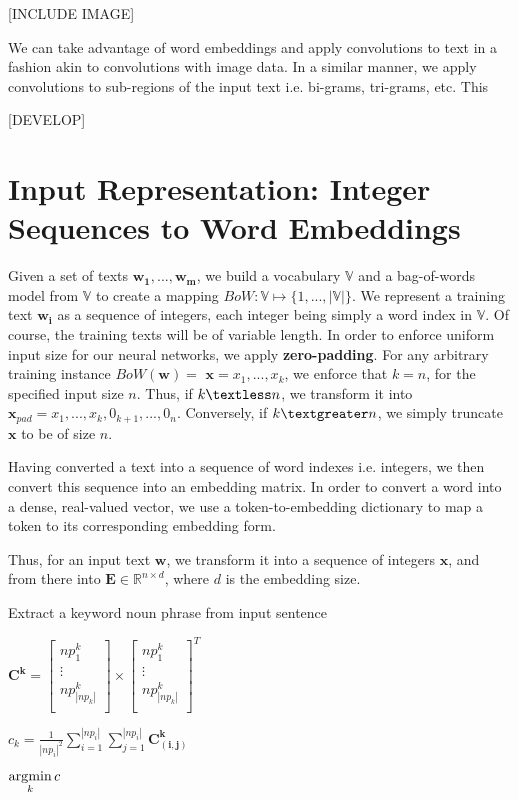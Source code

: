 [INCLUDE IMAGE]

We can take advantage of word embeddings and apply convolutions to text in a fashion akin to convolutions with
image data. In a similar manner, we apply convolutions to sub-regions of the input text i.e. bi-grams, tri-grams, etc.
This


[DEVELOP]

\section{Input Representation: Integer Sequences to Word Embeddings}
Given a set of texts $\bm{w_1},...,\bm{w_m}$, we build a vocabulary $\mathbb{V}$ and a bag-of-words model from $\mathbb{V}$ to create a mapping $BoW:\mathbb{V} \mapsto \{1,...,|\mathbb{V}|\}$.
We represent a training text $\bm{w_i}$ as a sequence of integers, each integer being simply a word index
in $\mathbb{V}$. Of course, the training texts will be of variable length. In order to enforce uniform input size for our neural networks, we apply \textbf{zero-padding}.
For any arbitrary training instance $BoW(\bm{w})=$ $\bm{x} = x_1,...,x_k$, we enforce that $k = n$, for the specified input size
$n$. Thus, if $k \textless n$, we transform it into $\bm{x}_{pad} = x_1,...,x_k, 0_{k+1}, ..., 0_{n}$. Conversely, if
$k \textgreater n$, we simply truncate $\bm{x}$ to be of size $n$.

Having converted a text into a sequence of word indexes i.e. integers, we then convert this sequence into an embedding matrix.
In order to convert a word into a dense, real-valued vector, we use a token-to-embedding dictionary to map a token to its corresponding embedding form.

Thus, for an input text $\bm{w}$, we transform it into a sequence of integers $\bm{x}$, and from there into $\mathbf{E} \in \mathbb{R}^{n \times d}$, where $d$ is
the embedding size.

\begin{algorithm}[H]
\caption{Extract a keyword noun phrase from input sentence}
\begin{algorithmic}[1]
\State$ \bm{C^k} = \begin{bmatrix}
         np^{k}_{1} \\
         \vdots \\
         np^{k}_{|np_k|} \\
        \end{bmatrix} \times  \begin{bmatrix}
         np^{k}_{1} \\
         \vdots \\
         np^{k}_{|np_k|} \\
        \end{bmatrix}^{T}$

\State$c_{k} = \frac{1}{|np_i|^2} \sum^{|np_i|}_{i=1} \sum^{|np_i|}_{j=1} \bm{C^{k}_{(i,j)}}$
\EndFor

\Return $\operatorname*{\arg\!\min}\limits_{k} c$
\EndProcedure
\end{algorithmic}
\end{algorithm}

